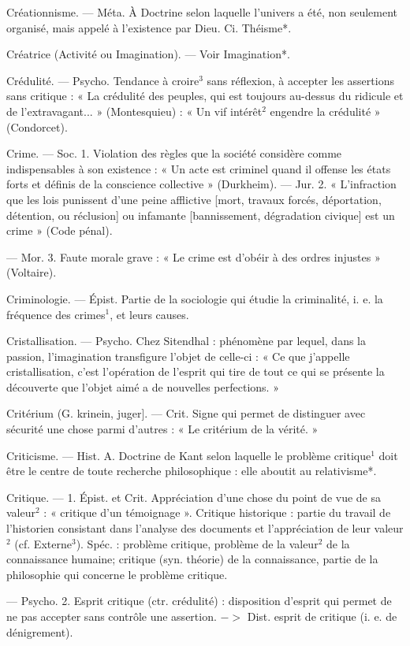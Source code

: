 Créationnisme. — Méta. À Doctrine
selon laquelle l'univers a été, non
seulement organisé, mais appelé à
l'existence par Dieu. Ci. Théisme*.

Créatrice (Activité ou Imagination).
— Voir Imagination*.

Crédulité. — Psycho. Tendance à
croire$^3$ sans réflexion, à accepter les
assertions sans critique : « La crédulité des peuples, qui est toujours au-dessus du ridicule et de l’extravagant... » (Montesquieu) : « Un vif
intérêt$^2$ engendre la crédulité »
(Condorcet).

Crime. — Soc. 1. Violation des règles
que la société considère comme
indispensables à son existence : « Un
acte est criminel quand il offense les
états forts et définis de la conscience
collective » (Durkheim). — Jur.
2. « L’infraction que les lois punissent d’une peine afflictive [mort,
travaux forcés, déportation, détention, ou réclusion] ou infamante
[bannissement, dégradation civique]
est un crime » (Code pénal).

— Mor. 3. Faute morale grave :
« Le crime est d’obéir à des ordres
injustes » (Voltaire).

Criminologie. — Épist. Partie de la
sociologie qui étudie la criminalité,
i. e. la fréquence des crimes$^1$, et leurs
causes.

Cristallisation. — Psycho. Chez Sitendhal : phénomène par lequel, dans
la passion, l'imagination transfigure
l’objet de celle-ci : « Ce que j'appelle
cristallisation, c’est l'opération de
l'esprit qui tire de tout ce qui se
présente la découverte que l’objet
aimé a de nouvelles perfections. »

Critérium (G. krinein, juger]. — Crit.
Signe qui permet de distinguer avec
sécurité une chose parmi d’autres :
« Le critérium de la vérité. »

Criticisme. — Hist. A. Doctrine de
Kant selon laquelle le problème
critique$^1$ doit être le centre de toute
recherche philosophique : elle aboutit
au relativisme*.

Critique. — 1. Épist. et Crit. Appréciation d’une chose du point de vue
de sa valeur$^2$ : « critique d’un témoignage ». Critique historique : partie
du travail de l'historien consistant
dans l'analyse des documents et
l'appréciation de leur valeur$^2$ (cf.
Externe$^3$). Spéc. : problème critique,
problème de la valeur$^2$ de la connaissance humaine; critique (syn.
théorie) de la connaissance, partie de
la philosophie qui concerne le problème critique.

— Psycho. 2. Esprit critique (ctr.
crédulité) : disposition d'esprit qui
permet de ne pas accepter sans contrôle une assertion. $->$ Dist. esprit
de critique (i. e. de dénigrement).

